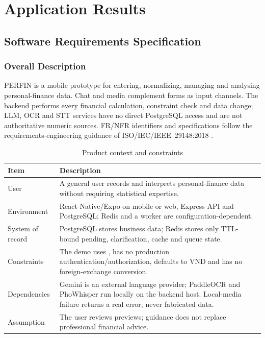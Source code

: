 \chapter{Application Results}
\label{chap:results}

\section{Software Requirements Specification}

\subsection{Overall Description}

PERFIN is a mobile prototype for entering, normalizing, managing and analysing personal-finance data. Chat and media complement forms as input channels. The backend performs every financial calculation, constraint check and data change; LLM, OCR and STT services have no direct PostgreSQL access and are not authoritative numeric sources. FR/NFR identifiers and specifications follow the requirements-engineering guidance of ISO/IEC/IEEE~29148:2018 \cite{iso29148}.

\begin{table}[H]
  \centering
  \caption{Product context and constraints}
  \label{tab:product-overview}
  \begin{tabularx}{\textwidth}{@{}L{3.5cm}Y@{}}
    \toprule
    \textbf{Item} & \textbf{Description} \\
    \midrule
    User & A general user records and interprets personal-finance data without requiring statistical expertise. \\
    Environment & React Native/Expo on mobile or web, Express API and PostgreSQL; Redis and a worker are configuration-dependent. \\
    System of record & PostgreSQL stores business data; Redis stores only TTL-bound pending, clarification, cache and queue state. \\
    Constraints & The demo uses , has no production authentication/authorization, defaults to VND and has no foreign-exchange conversion. \\
    Dependencies & Gemini is an external language provider; PaddleOCR and PhoWhisper run locally on the backend host. Local-media failure returns a real error, never fabricated data. \\
    Assumption & The user reviews previews; guidance does not replace professional financial advice. \\
    \bottomrule
  \end{tabularx}
\end{table}

